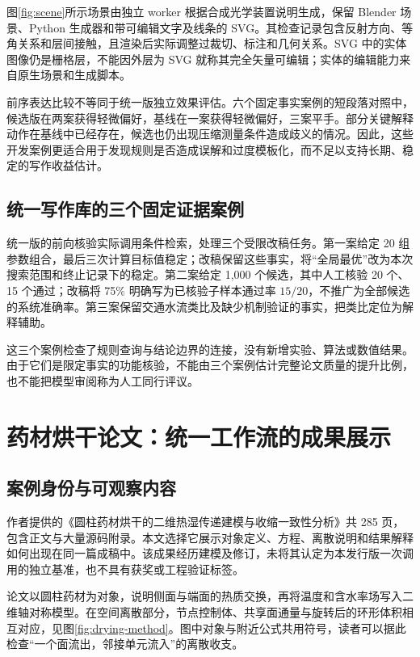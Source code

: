 \documentclass[UTF8,a4paper,zihao=-4,fontset=fandol]{ctexart}
\begin{document}
图\ref{fig:scene}所示场景由独立 worker 根据合成光学装置说明生成，保留 Blender 场景、Python 生成器和带可编辑文字及线条的 SVG。其检查记录包含反射方向、等角关系和层间接触，且渲染后实际调整过裁切、标注和几何关系\cite{physical}。SVG 中的实体图像仍是栅格层，不能因外层为 SVG 就称其完全矢量可编辑；实体的编辑能力来自原生场景和生成脚本。

前序表达比较不等同于统一版独立效果评估。六个固定事实案例的短段落对照中，候选版在两案获得轻微偏好，基线在一案获得轻微偏好，三案平手\cite{transfer}。部分关键解释动作在基线中已经存在，候选也仍出现压缩测量条件造成歧义的情况。因此，这些开发案例更适合用于发现规则是否造成误解和过度模板化，而不足以支持长期、稳定的写作收益估计。

\subsection{统一写作库的三个固定证据案例}

统一版的前向核验实际调用条件检索，处理三个受限改稿任务\cite{forward}。第一案给定 20 组参数组合，最后三次计算目标值稳定；改稿保留这些事实，将“全局最优”改为本次搜索范围和终止记录下的稳定。第二案给定 1,000 个候选，其中人工核验 20 个、15 个通过；改稿将 75\% 明确写为已核验子样本通过率 $15/20$，不推广为全部候选的系统准确率。第三案保留交通水流类比及缺少机制验证的事实，把类比定位为解释辅助。

这三个案例检查了规则查询与结论边界的连接，没有新增实验、算法或数值结果。由于它们是限定事实的功能核验，不能由三个案例估计完整论文质量的提升比例，也不能把模型审阅称为人工同行评议。

\section{药材烘干论文：统一工作流的成果展示}

\subsection{案例身份与可观察内容}

作者提供的《圆柱药材烘干的二维热湿传递建模与收缩一致性分析》共 285 页，包含正文与大量源码附录\cite{drying}。本文选择它展示对象定义、方程、离散说明和结果解释如何出现在同一篇成稿中。该成果经历建模及修订，未将其认定为本发行版一次调用的独立基准，也不具有获奖或工程验证标签。

论文以圆柱药材为对象，说明侧面与端面的热质交换，再将温度和含水率场写入二维轴对称模型。在空间离散部分，节点控制体、共享面通量与旋转后的环形体积相互对应，见图\ref{fig:drying-method}。图中对象与附近公式共用符号，读者可以据此检查“一个面流出，邻接单元流入”的离散收支。
\end{document}

